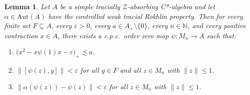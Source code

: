 \documentclass[11pt]{amsart}
\theoremstyle{plain}
\newtheorem{lemma}[theorem]{Lemma}
\theoremstyle{definition}
\theoremstyle{remark}
\numberwithin{equation}{section}
\newcounter{TmpEnumi}
\begin{document}
\begin{lemma}\label{lem_int}
Let $A$ be a simple tracially $\mathcal{Z}$-absorbing C*-algebra
and let $\alpha \in \mathrm{Aut} (A)$
have the controlled weak tracial Rokhlin property.
Then for every finite set $F \subseteq A$, every $\varepsilon > 0$,
every $a \in A_{+} \setminus \{ 0 \}$, every $n \in \mathbb{N}$,
and every positive contraction $x \in A$,
there exists a c.p.c.~order zero map $\psi \colon M_{n} \to A$
such that:
\begin{enumerate}[label=$\mathrm{(\arabic*)}$]
\item\label{lem7_9item1}
$\big( x^{2} - x \psi (1) x - \varepsilon \big)_{+} \precsim a$.
\item\label{lem7_9item2}
$\| [\psi (z), y] \| < \varepsilon$ for all $y \in F$
and all $z \in M_{n}$ with $\|z\| \leq 1$.
\item\label{lem7_9item3}
$\|\alpha (\psi (z)) - \psi (z) \| < \varepsilon$
for all $z \in M_{n}$ with $\|z\| \leq 1$.
\setcounter{TmpEnumi}{\value{enumi}}
\end{enumerate}
%
\end{lemma}
\end{document}
